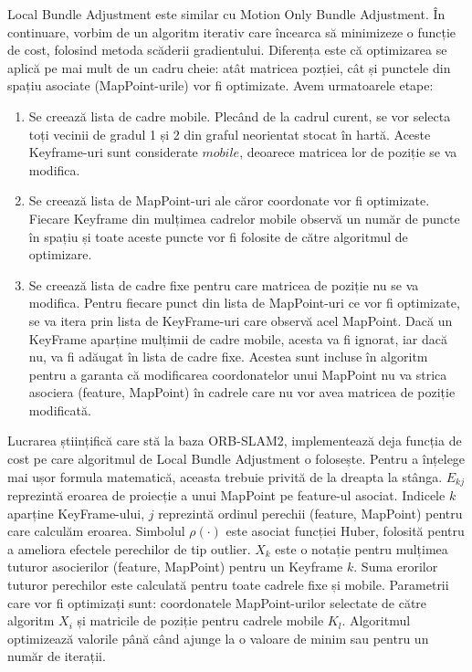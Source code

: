 \documentclass[12pt,a4paper]{report}
\begin{document}
Local Bundle Adjustment este similar cu Motion Only Bundle Adjustment. În continuare, vorbim de un
algoritm iterativ care încearca să minimizeze o funcție de cost, folosind metoda scăderii 
gradientului. Diferența este că optimizarea se aplică pe mai mult de un cadru cheie: atât
matricea pozției, cât și punctele din spațiu asociate (MapPoint-urile) vor fi optimizate.
Avem urmatoarele etape:
\begin{enumerate}
    \item Se creează lista de cadre mobile. Plecând de la cadrul curent, se vor selecta
    toți vecinii de gradul 1 și 2 din graful neorientat stocat în hartă. Aceste Keyframe-uri
    sunt considerate \(mobile\), deoarece matricea lor de poziție se va modifica.  
    \item Se creează lista de MapPoint-uri ale căror coordonate vor fi optimizate. Fiecare
Keyframe din mulțimea cadrelor mobile observă un număr de puncte în spațiu și toate aceste
puncte vor fi folosite de către algoritmul de optimizare.
    \item Se creează lista de cadre fixe pentru care matricea de poziție nu se va 
modifica. Pentru fiecare punct din lista de MapPoint-uri ce vor fi optimizate, se va itera 
prin lista de KeyFrame-uri care observă acel MapPoint. Dacă un KeyFrame aparține mulțimii 
de cadre mobile, acesta va fi ignorat, iar dacă nu, va fi adăugat în lista de
cadre fixe. Acestea sunt incluse în algoritm pentru a garanta că modificarea coordonatelor
unui MapPoint nu va strica asociera (feature, MapPoint) în cadrele care nu vor avea matricea
de poziție modificată. 
\end{enumerate}

Lucrarea științifică care stă la baza ORB-SLAM2, implementează deja funcția de 
cost pe care algoritmul de Local Bundle Adjustment o folosește. Pentru a înțelege mai ușor formula 
matematică, aceasta trebuie privită de la dreapta la stânga. \(E_{kj}\) reprezintă eroarea
de proiecție a unui MapPoint pe feature-ul asociat. Indicele \(k\) aparține KeyFrame-ului,
\(j\) reprezintă ordinul perechii (feature, MapPoint) pentru care calculăm eroarea. Simbolul 
$ \rho(\cdot) $ este asociat funcției Huber, folosită pentru a ameliora efectele perechilor de tip 
outlier. \(X_k\) este o notație pentru mulțimea tuturor asocierilor (feature, MapPoint) pentru un 
Keyframe \(k\). Suma erorilor tuturor perechilor este calculată pentru toate cadrele fixe și mobile.
Parametrii care vor fi optimizați sunt: coordonatele MapPoint-urilor selectate de către
algoritm \(X_i\) și matricile de poziție pentru cadrele mobile \( K_l \). Algoritmul 
optimizează valorile până când ajunge la o valoare de minim sau pentru un număr de iterații. 
\end{document}
